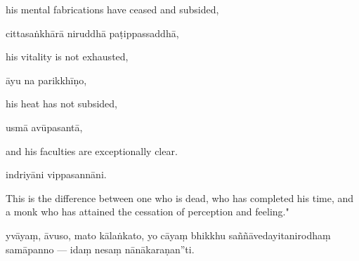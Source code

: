 \begin{samepage}
\begin{leftcolumn*}
his mental fabrications have ceased and subsided,
\end{leftcolumn*}

\begin{rightcolumn}
cittasaṅkhārā niruddhā paṭippassaddhā,
\end{rightcolumn}
\end{samepage}

\begin{samepage}
\begin{leftcolumn*}
his vitality is not exhausted,
\end{leftcolumn*}

\begin{rightcolumn}
āyu na parikkhīṇo,
\end{rightcolumn}
\end{samepage}

\begin{samepage}
\begin{leftcolumn*}
his heat has not subsided,
\end{leftcolumn*}

\begin{rightcolumn}
usmā avūpasantā,
\end{rightcolumn}
\end{samepage}

\begin{samepage}
\begin{leftcolumn*}
and his faculties are exceptionally clear.
\end{leftcolumn*}

\begin{rightcolumn}
indriyāni vippasannāni.
\end{rightcolumn}
\end{samepage}

\begin{samepage}
\begin{leftcolumn*}
This is the difference between one who is dead, who has completed his time, and a monk who has attained the cessation of perception and feeling."
\end{leftcolumn*}

\begin{rightcolumn}
yvāyaṃ, āvuso, mato kālaṅkato, yo cāyaṃ bhikkhu saññāvedayitanirodhaṃ samāpanno — idaṃ nesaṃ nānākaraṇan”ti.
\end{rightcolumn}
\end{samepage}

